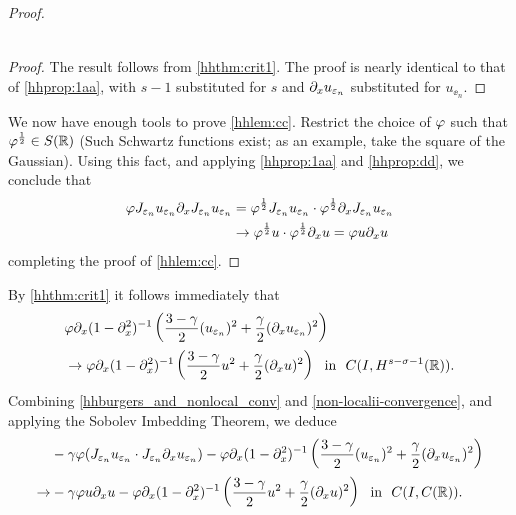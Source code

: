 \begin{proof}
\begin{proposition}
\begin{equation}
\begin{split}
\end{split}
\end{equation}
\end{proposition}
\begin{proof} The result follows from \cref{hhthm:crit1}.
The proof is nearly identical to that of
\cref{hhprop:1aa}, with $s-1$ substituted for $s$
and $\partial_x u_{\varepsilon_n}$ substituted for $u_{\ee_n}$. 
\end{proof}
%
%
We now have enough tools to prove \cref{hhlem:cc}. Restrict the
choice of $\varphi$ such that $\varphi^\frac{1}{2} \in S(\mathbb{R})$
(Such Schwartz functions exist; as an example, take the square
of the Gaussian). Using this fact, and applying \cref{hhprop:1aa} and \cref{hhprop:dd}, we conclude that
\begin{equation*}
\begin{split}
\varphi J_{\varepsilon_n} u_{\varepsilon_n} \partial_x J_{\varepsilon_n} u_{\varepsilon_n} 
& = \varphi^\frac{1}{2} J_{\varepsilon_n} u_{\varepsilon_n} \cdot
\varphi^\frac{1}{2} \partial_x J_{\varepsilon_n} u_{\varepsilon_n}
\\
& \to \varphi^\frac{1}{2} u \cdot \varphi^\frac{1}{2} \partial_x u = \varphi
u \partial_x u
\end{split}
\end{equation*}
completing the proof of \cref{hhlem:cc}. 
\end{proof}
%
%
%
%
By \cref{hhthm:crit1} it follows immediately that
\begin{equation}
\begin{split}
& \varphi \partial_x(1- \partial_x^2)^{-1} \left( \frac{3-\gamma}{2}
(u_{\varepsilon_n})^2
+ \frac{\gamma}{2} (\partial_x u_{\varepsilon_n})^2 \right )
\\
& \to
\varphi \partial_x(1- \partial_x^2)^{-1} \left( \frac{3-\gamma}{2} u^2
+ \frac{\gamma}{2} (\partial_x u)^2 \right ) \ \
\text{in} \ \ C(I, H^{s-\sigma-1}(\mathbb{R})).
\label{non-localii-convergence}
\end{split}
\end{equation}
Combining \eqref{hhburgers_and_nonlocal_conv} and
\eqref{non-localii-convergence}, and applying the Sobolev Imbedding
Theorem, we deduce 
\begin{equation}
\begin{split}
& -\gamma \varphi (J_{\varepsilon_n} u_{\varepsilon_n} \cdot J_{\varepsilon_n} \partial_x
u_{\varepsilon_n}) -
\varphi \partial_x(1- \partial_x^2)^{-1} \left( \frac{3-\gamma}{2}
(u_{\varepsilon_n})^2
+ \frac{\gamma}{2} (\partial_x u_{\varepsilon_n})^2 \right )
\\
\to & -\gamma \varphi u \partial_x u -
\varphi \partial_x(1- \partial_x^2)^{-1} \left( \frac{3-\gamma}{2} u^2
+ \frac{\gamma}{2} (\partial_x u)^2 \right ) \ \
\text{in} \ \ C(I, C(\mathbb{R})).
\label{llloc-non-loc-tog}
\end{split}
\end{equation}
